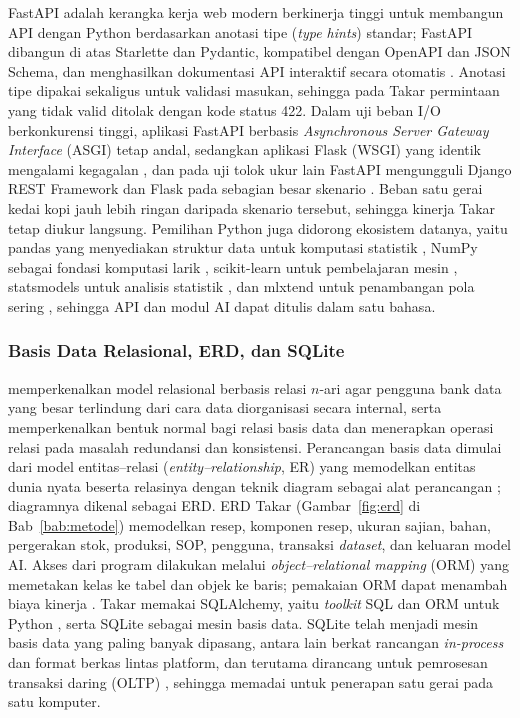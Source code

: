 FastAPI adalah kerangka kerja web modern berkinerja tinggi untuk membangun API dengan Python berdasarkan anotasi tipe (\textit{type hints}) standar; FastAPI dibangun di atas Starlette dan Pydantic, kompatibel dengan OpenAPI dan JSON Schema, dan menghasilkan dokumentasi API interaktif secara otomatis \citep*{ramirez2026fastapi}. Anotasi tipe dipakai sekaligus untuk validasi masukan, sehingga pada Takar permintaan yang tidak valid ditolak dengan kode status 422. Dalam uji beban I/O berkonkurensi tinggi, aplikasi FastAPI berbasis \textit{Asynchronous Server Gateway Interface} (ASGI) tetap andal, sedangkan aplikasi Flask (WSGI) yang identik mengalami kegagalan \citep*{alaanzy2026performance}, dan pada uji tolok ukur lain FastAPI mengungguli Django REST Framework dan Flask pada sebagian besar skenario \citep*{bednarz2025benchmarking}. Beban satu gerai kedai kopi jauh lebih ringan daripada skenario tersebut, sehingga kinerja Takar tetap diukur langsung. Pemilihan Python juga didorong ekosistem datanya, yaitu pandas yang menyediakan struktur data untuk komputasi statistik \citep*{mckinney2010data}, NumPy sebagai fondasi komputasi larik \citep{harris2020array}, scikit-learn untuk pembelajaran mesin \citep{pedregosa2011scikitlearn}, statsmodels untuk analisis statistik \citep*{seabold2010statsmodels}, dan mlxtend untuk penambangan pola sering \citep*{raschka2018mlxtend}, sehingga API dan modul AI dapat ditulis dalam satu bahasa.

\subsubsection{Basis Data Relasional, ERD, dan SQLite}
\label{subsubsec:basis-data}

\citet*{codd1970relational} memperkenalkan model relasional berbasis relasi $n$-ari agar pengguna bank data yang besar terlindung dari cara data diorganisasi secara internal, serta memperkenalkan bentuk normal bagi relasi basis data dan menerapkan operasi relasi pada masalah redundansi dan konsistensi. Perancangan basis data dimulai dari model entitas--relasi (\textit{entity--relationship}, ER) yang memodelkan entitas dunia nyata beserta relasinya dengan teknik diagram sebagai alat perancangan \citep*{chen1976entity}; diagramnya dikenal sebagai ERD. ERD Takar (Gambar~\ref{fig:erd} di Bab~\ref{bab:metode}) memodelkan resep, komponen resep, ukuran sajian, bahan, pergerakan stok, produksi, SOP, pengguna, transaksi \textit{dataset}, dan keluaran model AI. Akses dari program dilakukan melalui \textit{object--relational mapping} (ORM) yang memetakan kelas ke tabel dan objek ke baris; pemakaian ORM dapat menambah biaya kinerja \citep*{bednarz2025benchmarking}. Takar memakai SQLAlchemy, yaitu \textit{toolkit} SQL dan ORM untuk Python \citep*{bayer2026sqlalchemy}, serta SQLite sebagai mesin basis data. SQLite telah menjadi mesin basis data yang paling banyak dipasang, antara lain berkat rancangan \textit{in-process} dan format berkas lintas platform, dan terutama dirancang untuk pemrosesan transaksi daring (OLTP) \citep{gaffney2022sqlite}, sehingga memadai untuk penerapan satu gerai pada satu komputer.

